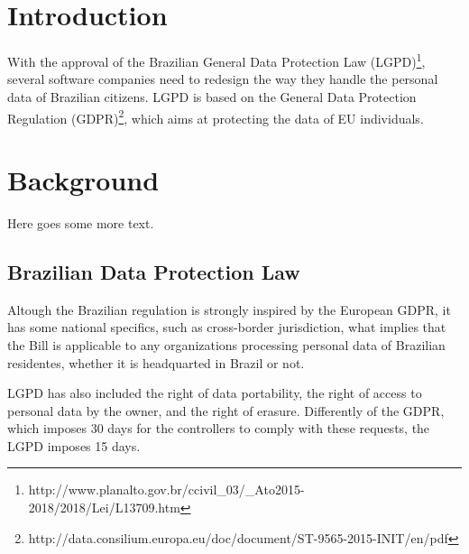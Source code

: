 \documentclass[sigconf]{acmart}
\begin{document}

%

%
\maketitle

\section{Introduction}

With the approval of the Brazilian General Data Protection Law (LGPD)\footnote{http://www.planalto.gov.br/ccivil_03/_Ato2015-2018/2018/Lei/L13709.htm}, several software companies need to redesign the way they handle the personal data of Brazilian citizens. LGPD is based on the General Data Protection Regulation (GDPR)\footnote{http://data.consilium.europa.eu/doc/document/ST-9565-2015-INIT/en/pdf}, which aims at protecting the data of EU individuals.






\section{Background}
Here goes some more text.

\subsection{Brazilian Data Protection Law}
Altough the Brazilian regulation is strongly inspired by the European GDPR, it has some national specifics, such as cross-border jurisdiction, what implies that the Bill is applicable to any organizations processing personal data of Brazilian residentes, whether it is headquarted in Brazil or not.

LGPD has also included the right of data portability, the right of access to personal data by the owner, and the right of erasure. Differently of the GDPR, which imposes 30 days for the controllers to comply with these requests, the LGPD imposes 15 days.
\end{document}
